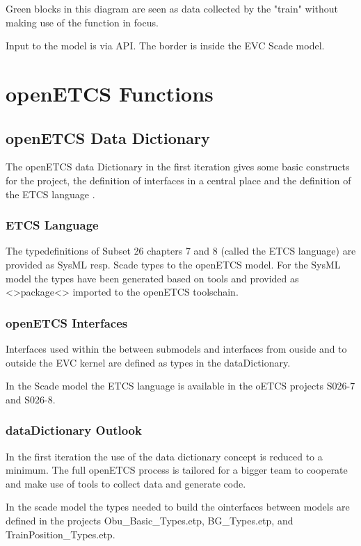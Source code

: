 \documentclass{template/openetcs_article}
\begin{document}
Green blocks in this diagram are seen as data collected by the "train" without making use of the function in focus.

Input to the model is via API. The border is inside the EVC Scade model. 

\section{openETCS Functions}


\subsection{openETCS Data Dictionary}

The openETCS data Dictionary in the first iteration gives some basic constructs for the project, the definition of interfaces in a central place and the definition of the ETCS language \cite{dataDictionary}.

\subsubsection{ETCS Language}
The typedefinitions of Subset 26 chapters 7 and 8 (called the ETCS language) are provided as SysML resp. Scade types to the openETCS model. For the SysML model the types have been generated based on tools and provided as <>package<> imported to the openETCS toolschain.

\subsubsection{openETCS Interfaces}
Interfaces used within the between submodels and interfaces from ouside and to outside the EVC kernel are defined as types in the dataDictionary.

In the Scade model  the ETCS language is available in the oETCS projects S026-7 and S026-8.

\subsubsection{dataDictionary Outlook}
In the first iteration the use of the data dictionary concept is reduced to a minimum. The full openETCS process is tailored for a bigger team to cooperate and make use of tools to collect data and generate code. 

In the scade model the types needed to build the ointerfaces between models are defined in the projects Obu\_Basic\_Types.etp, BG\_Types.etp, and TrainPosition\_Types.etp.
\end{document}
